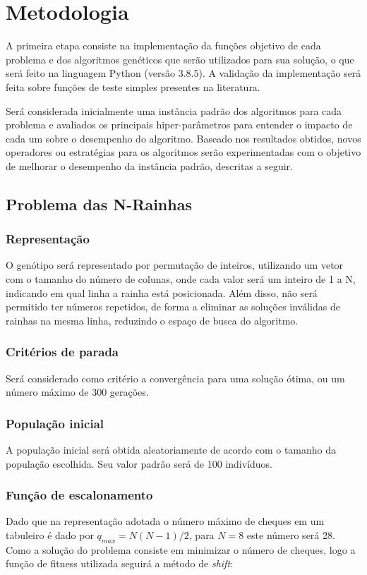 \documentclass[conference]{IEEEtran}
\begin{document}
\section{Metodologia}

A primeira etapa consiste na implementação da funções objetivo de cada problema e dos algoritmos genéticos que serão utilizados para sua solução, o que será feito na linguagem Python (versão 3.8.5). A validação da implementação será feita sobre funções de teste simples presentes na literatura. 

Será considerada inicialmente uma instância padrão dos algoritmos para cada problema e avaliados os principais hiper-parâmetros para entender o impacto de cada um sobre o desempenho do algoritmo. Baseado nos resultados obtidos, novos operadores ou estratégias para os algoritmos serão experimentadas com o objetivo de melhorar o desempenho da instância padrão, descritas a seguir.

\subsection{Problema das N-Rainhas}

\subsubsection{{Representação}}
O genótipo será representado por permutação de inteiros, utilizando um vetor com o tamanho do número de colunas, onde cada valor será um inteiro de 1 a N, indicando em qual linha a rainha está posicionada. Além disso, não será permitido ter números repetidos, de forma a eliminar as soluções inválidas de rainhas na mesma linha, reduzindo o espaço de busca do algoritmo. 

\subsubsection{{Critérios de parada}}
Será considerado como critério a convergência para uma solução ótima, ou um número máximo de 300 gerações.

\subsubsection{População inicial}
A população inicial será obtida aleatoriamente de acordo com o tamanho da população escolhida. Seu valor padrão será de 100 indivíduos.

\subsubsection{Função de escalonamento}
Dado que na representação adotada o número máximo de cheques em um tabuleiro é dado por $q_{max} = N(N-1)/2$, para $N=8$ este número será 28. Como a solução do problema consiste em minimizar o número de cheques, logo a função de fitness utilizada seguirá a método de \textit{shift}:
\end{document}
